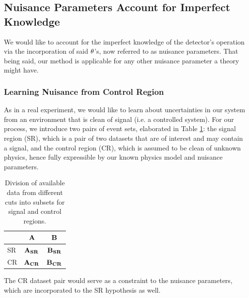 \documentclass[../../ddppaper2.tex]{subfiles}
\begin{document}
\subsection{Nuisance Parameters Account for Imperfect Knowledge}

We would like to account for the imperfect knowledge of the detector's operation via the incorporation of said ${\theta}$'s, now referred to as nuisance parameters. That being said, our method is applicable for any other nuisance parameter a theory might have.

\subsubsection{Learning Nuisance from Control Region}

As in a real experiment, we would like to learn about uncertainties in our system from an environment that is clean of signal (i.e. a controlled system). For our process, we introduce two pairs of event sets, elaborated in Table \ref{table:division_of_data}: the signal region (SR), which is a pair of two datasets that are of interest and may contain a signal, and the control region (CR), which is assumed to be clean of unknown physics, hence fully expressible by our known physics model and nuisance parameters.

\begin{table}[ht]%
\centering
\caption{\label{table:division_of_data}}
\begin{ruledtabular}
\begin{tabular}{| l | c | c |}
 & ${\mathbf{A}}$ & ${\mathbf{B}}$ \\
\hline
SR & ${\mathbf{A_{SR}}}$ & ${\mathbf{B_{SR}}}$ \\
CR & ${\mathbf{A_{CR}}}$ & ${\mathbf{B_{CR}}}$ \\
\end{tabular}
\end{ruledtabular}
\caption{Division of available data from different cuts into subsets for signal and control regions.}
\end{table}

The CR dataset pair would serve as a constraint to the nuisance parameters, which are incorporated to the SR hypothesis as well.
\end{document}

